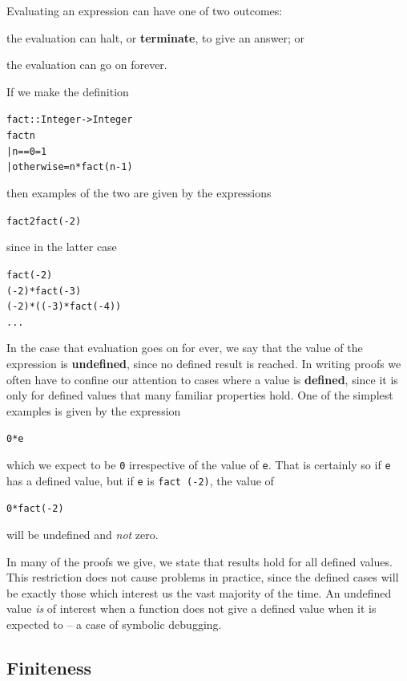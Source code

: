 Evaluating an expression
can have one of two outcomes:

\begin{titemize}
\item the evaluation can halt, or \textbf{terminate}, to give an answer; or
\item the evaluation can go on forever.
\end{titemize}
If we make the definition
\begin{alltt}
fact :: Integer -> Integer
fact n
  | n==0        = 1
  | otherwise   = n * fact (n-1)
\end{alltt}
then examples of the two are given by the expressions
\begin{alltt}
fact 2                     fact (-2)
\end{alltt}
since in the latter case
\begin{alltt}
fact (-2)
\step (-2) * fact (-3)
\step (-2) * ((-3) * fact (-4))
\step ...
\end{alltt}
In the case that evaluation goes on for ever, we say that
the value of the expression is \textbf{undefined}, since no defined result is reached. In
writing proofs we often have to confine our attention to cases where a
value is \textbf{defined}, since it is only for defined values that many familiar
properties hold. One of the simplest examples is given by the expression
\begin{alltt}
0*e
\end{alltt}
which we expect to be \texttt{0} irrespective of the value of \texttt{e}.
That is certainly so if \texttt{e} has a defined
value, but if \texttt{e} is \texttt{fact (-2)}, the value of 
\begin{alltt}
0 * fact (-2)
\end{alltt}
will be undefined and {\em not\/} zero.

In many of the proofs we give, we state that results hold for all
defined values. This restriction does not cause problems in practice,
since the defined cases will be exactly those which interest
us the vast majority of the time. An undefined value {\it is\/}
of interest when a function does not give a defined value when it is
expected to -- a case of symbolic debugging.

\subsection*{Finiteness}

